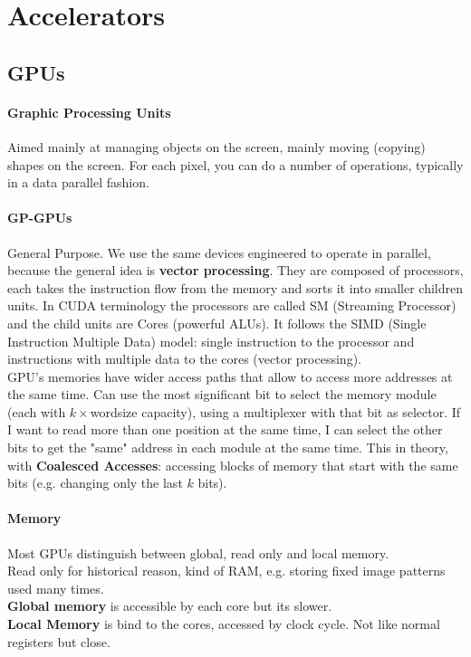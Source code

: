 \documentclass[10pt]{report}
\begin{document}
\section{Accelerators}
\subsection{GPUs}
\paragraph{Graphic Processing Units} Aimed mainly at managing objects on the screen, mainly moving (copying) shapes on the screen. For each pixel, you can do a number of operations, typically in a data parallel fashion.
\paragraph{GP-GPUs} General Purpose. We use the same devices engineered to operate in parallel, because the general idea is \textbf{vector processing}. They are composed of processors, each takes the instruction flow from the memory and sorts it into smaller children units. In CUDA terminology the processors are called SM (Streaming Processor) and the child units are Cores (powerful ALUs). It follows the SIMD (Single Instruction Multiple Data) model: single instruction to the processor and instructions with multiple data to the cores (vector processing).\\
GPU's memories have wider access paths that allow to access more addresses at the same time. Can use the most significant bit to select the memory module (each with $k\times$wordsize capacity), using a multiplexer with that bit as selector. If I want to read more than one position at the same time, I can select the other bits to get the "same" address in each module at the same time. This in theory, with \textbf{Coalesced Accesses}: accessing blocks of memory that start with the same bits (e.g. changing only the last $k$ bits).
\paragraph{Memory} Most GPUs distinguish between global, read only and local memory.\\
Read only for historical reason, kind of RAM, e.g. storing fixed image patterns used many times.\\
\textbf{Global memory} is accessible by each core but its slower.\\
\textbf{Local Memory} is bind to the cores, accessed by clock cycle. Not like normal registers but close.
\end{document}
